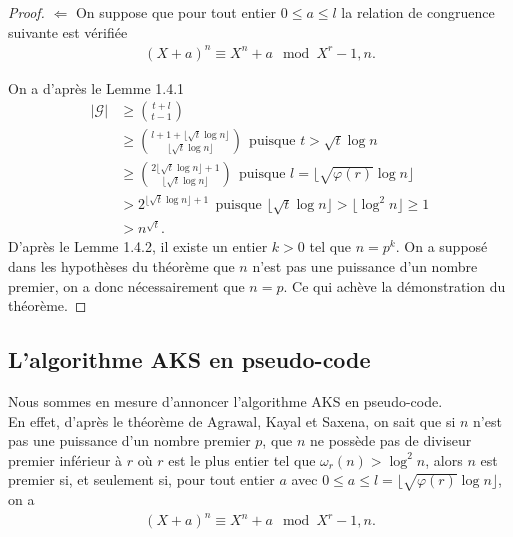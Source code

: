 \documentclass[11pt]{article}
\begin{document}
\begin{small}
\begin{proof}
$\Leftarrow$ On suppose que pour tout entier $0 \leqslant a \leqslant l$ la relation de congruence suivante est vérifiée
\begin{align*}
(X+a)^n \equiv X^n + a \mod X^r-1,n.
\end{align*}

On a d'après le Lemme 1.4.1
\begin{align*}
\vert \mathcal{G} \vert &\geqslant \binom{t+l}{t-1}\\
&\geqslant \binom{l+1+\lfloor \sqrt{t}\log n \rfloor}{\lfloor \sqrt{t}\log n \rfloor} \ \ \text{puisque $t> \sqrt{t}\log n$}\\
&\geqslant \binom{2 \lfloor \sqrt{t}\log n \rfloor +1}{\lfloor \sqrt{t}\log n \rfloor}\ \ \text{puisque $l=\lfloor \sqrt{\varphi(r)}\log n \rfloor$}\\
&> 2^{\lfloor \sqrt{t}\log n \rfloor +1}\ \ \text{puisque $\lfloor \sqrt{t}\log n \rfloor > \lfloor \log^2 n \rfloor \geqslant 1$}\\
&> n^{\sqrt{t}}.
\end{align*}
D'après le Lemme 1.4.2, il existe un entier $k>0$ tel que $n=p^k$. On a supposé dans les hypothèses du théorème que $n$ n'est pas une puissance d'un nombre premier, on a donc nécessairement que $n=p$. Ce qui achève la démonstration du théorème.
\end{proof}
\end{small}

\subsection{L'algorithme AKS en pseudo-code}

Nous sommes en mesure d'annoncer l'algorithme AKS en pseudo-code.\\

En effet, d'après le théorème de Agrawal, Kayal et Saxena, on sait que si $n$ n'est pas une puissance d'un nombre premier $p$, que $n$ ne possède pas de diviseur premier inférieur à $r$ où $r$ est le plus entier tel que $\omega_r(n) > \log^2 n$, alors $n$ est premier si, et seulement si, pour tout entier $a$ avec $0 \leqslant a \leqslant l=\lfloor \sqrt{\varphi(r)} \log n \rfloor$, on a
\begin{align*}
(X+a)^n \equiv X^n+a \mod X^r-1,n.
\end{align*}

\newpage
\end{document}
